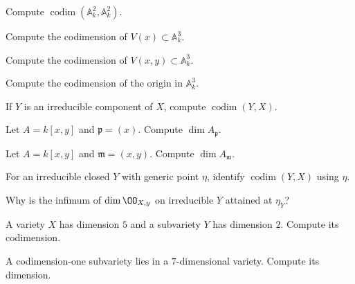 \begin{exercise}[VI.31.E1]\label{exer:vi31-01}
Compute $\operatorname{codim}(\mathbb A^2_k,\mathbb A^2_k)$.
\end{exercise}

\begin{exercise}[VI.31.E2]\label{exer:vi31-02}
Compute the codimension of $V(x)\subset\mathbb A^3_k$.
\end{exercise}

\begin{exercise}[VI.31.E3]\label{exer:vi31-03}
Compute the codimension of $V(x,y)\subset\mathbb A^3_k$.
\end{exercise}

\begin{exercise}[VI.31.E4]\label{exer:vi31-04}
Compute the codimension of the origin in $\mathbb A^3_k$.
\end{exercise}

\begin{exercise}[VI.31.E5]\label{exer:vi31-05}
If $Y$ is an irreducible component of $X$, compute $\operatorname{codim}(Y,X)$.
\end{exercise}

\begin{exercise}[VI.31.E6]\label{exer:vi31-06}
Let $A=k[x,y]$ and $\mathfrak p=(x)$. Compute $\dim A_{\mathfrak p}$.
\end{exercise}

\begin{exercise}[VI.31.E7]\label{exer:vi31-07}
Let $A=k[x,y]$ and $\mathfrak m=(x,y)$. Compute $\dim A_{\mathfrak m}$.
\end{exercise}

\begin{exercise}[VI.31.E8]\label{exer:vi31-08}
For an irreducible closed $Y$ with generic point $\eta$, identify $\operatorname{codim}(Y,X)$ using $\eta$.
\end{exercise}

\begin{exercise}[VI.31.E9]\label{exer:vi31-09}
Why is the infimum of $\dim\OO_{X,y}$ on irreducible $Y$ attained at $\eta_Y$?
\end{exercise}

\begin{exercise}[VI.31.E10]\label{exer:vi31-10}
A variety $X$ has dimension $5$ and a subvariety $Y$ has dimension $2$. Compute its codimension.
\end{exercise}

\begin{exercise}[VI.31.E11]\label{exer:vi31-11}
A codimension-one subvariety lies in a $7$-dimensional variety. Compute its dimension.
\end{exercise}

